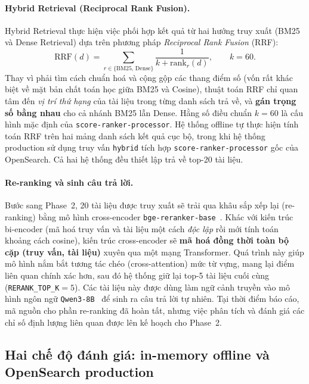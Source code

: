 \paragraph{Hybrid Retrieval (Reciprocal Rank Fusion).}
Hybrid Retrieval thực hiện việc phối hợp kết quả từ hai hướng truy xuất (BM25 và Dense Retrieval) dựa trên phương pháp \textit{Reciprocal Rank Fusion} (RRF):
\begin{equation}
    \mathrm{RRF}(d)=
    \sum_{r\in\{\mathrm{BM25},\,\mathrm{Dense}\}}
    \frac{1}{k+\mathrm{rank}_r(d)},
    \qquad
    k=60.
\end{equation}
Thay vì phải tìm cách chuẩn hoá và cộng gộp các thang điểm số (vốn rất khác biệt về mặt bản chất toán học giữa BM25 và Cosine), thuật toán RRF chỉ quan tâm đến \textit{vị trí thứ hạng} của tài liệu trong từng danh sách trả về, và \textbf{gán trọng số bằng nhau} cho cả nhánh BM25 lẫn Dense. Hằng số điều chuẩn $k=60$ là cấu hình mặc định của \texttt{score-ranker-processor}. Hệ thống offline tự thực hiện tính toán RRF trên hai mảng danh sách kết quả cục bộ, trong khi hệ thống production sử dụng truy vấn \texttt{hybrid} tích hợp \texttt{score-ranker-processor} gốc của OpenSearch. Cả hai hệ thống đều thiết lập trả về top-20 tài liệu.

\paragraph{Re-ranking và sinh câu trả lời.}
Bước sang Phase~2, 20 tài liệu được truy xuất sẽ trải qua khâu sắp xếp lại (re-ranking) bằng mô hình cross-encoder \texttt{bge-reranker-base}~\cite{xiao2024cpack}. Khác với kiến trúc bi-encoder (mã hoá truy vấn và tài liệu một cách \textit{độc lập} rồi mới tính toán khoảng cách cosine), kiến trúc cross-encoder sẽ \textbf{mã hoá đồng thời toàn bộ cặp (truy vấn, tài liệu)} xuyên qua một mạng Transformer. Quá trình này giúp mô hình nắm bắt tương tác chéo (cross-attention) mức từ vựng, mang lại điểm liên quan chính xác hơn, sau đó hệ thống giữ lại top-5 tài liệu cuối cùng (\texttt{RERANK\_TOP\_K}$=5$). Các tài liệu này được dùng làm ngữ cảnh truyền vào mô hình ngôn ngữ \texttt{Qwen3-8B}~\cite{qwen2025qwen3} để sinh ra câu trả lời tự nhiên. Tại thời điểm báo cáo, mã nguồn cho phần re-ranking đã hoàn tất, nhưng việc phân tích và đánh giá các chỉ số định lượng liên quan được lên kế hoạch cho Phase~2.

\subsection{Hai chế độ đánh giá: in-memory offline và OpenSearch production}

